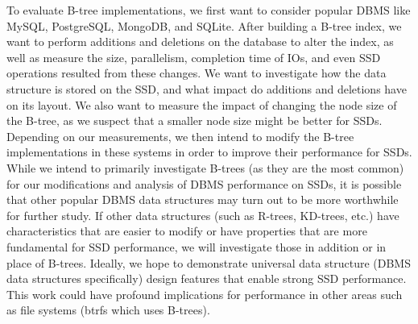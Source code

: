 To evaluate B-tree implementations, we first want to consider popular DBMS like MySQL, PostgreSQL, MongoDB, and SQLite.
After building a B-tree index, we want to perform additions and deletions on the database to alter the index, as well as measure the size, parallelism, completion time of IOs, and even SSD operations resulted from these changes.
We want to investigate how the data structure is stored on the SSD, and what impact do additions and deletions have on its layout.
We also want to measure the impact of changing the node size of the B-tree, as we suspect that a smaller node size might be better for SSDs.
Depending on our measurements, we then intend to modify the B-tree implementations in these systems in order to improve their performance for SSDs.\\

While we intend to primarily investigate B-trees (as they are the most common) for our modifications and analysis of DBMS performance on SSDs, it is possible that other popular DBMS data structures may turn out to be more worthwhile for further study.
If other data structures (such as R-trees, KD-trees, etc.) have characteristics that are easier to modify or have properties that are more fundamental for SSD performance, we will investigate those in addition or in place of B-trees.
Ideally, we hope to demonstrate universal data structure (DBMS data structures specifically) design features that enable strong SSD performance. This work could have profound implications for performance in other areas such as file systems (btrfs which uses B-trees).\\















